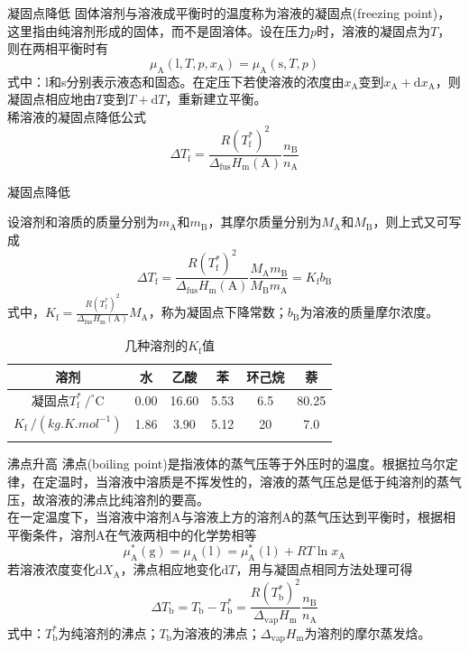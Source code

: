 \begin{frame}{凝固点降低}
    固体溶剂与溶液成平衡时的温度称为溶液的凝固点(freezing point)，这里指由纯溶剂形成的固体，而不是固溶体。设在压力$p$时，溶液的凝固点为$T$，则在两相平衡时有
    $$\mu_{\mathrm{A}}(\mathrm{l}, T, p, x_{\mathrm{A}})=\mu_{\mathrm{A}}(\mathrm{s}, T, p)$$
    式中：l和s分别表示液态和固态。在定压下若使溶液的浓度由$x_{\mathrm{A}}$变到$x_{\mathrm{A}}+\mathrm{d}x_{\mathrm{A}}$，则凝固点相应地由$T$变到$T+\mathrm{d}T$，重新建立平衡。
    \\稀溶液的凝固点降低公式
    $$\Delta T_{\mathrm{f}}=\frac{R\left(T_{\mathrm{f}}^{*}\right)^{2}}{\Delta_{\mathrm{fus}} H_{\mathrm{m}}(\mathrm{A})} \frac{n_{\mathrm{B}}}{n_{\mathrm{A}}}$$
\end{frame}


\begin{frame}{凝固点降低}
    
    设溶剂和溶质的质量分别为$m_\mathrm{A}$和$m_\mathrm{B}$，其摩尔质量分别为$M_\mathrm{A}$和$M_\mathrm{B}$，则上式又可写成
    $$\Delta T_{\mathrm{f}}=\frac{R\left(T_{\mathrm{f}}^{*}\right)^{2}}{\Delta_{\mathrm{fus}} H_{\mathrm{m}}(\mathrm{A})} \frac{M_\mathrm{A}m_\mathrm{B}}{M_\mathrm{B}m_\mathrm{A}}=K_{\mathrm{f}} b_{\mathrm{B}}$$
    式中，$K_{\mathrm{f}}=\frac{R\left(T_{\mathrm{f}}^{*}\right)^{2}}{\Delta_{\mathrm{fus}} H_{\mathrm{m}}(\mathrm{A})} M_{\mathrm{A}}$，称为凝固点下降常数；$b_\mathrm{B}$为溶液的质量摩尔浓度。
    \begin{table}
        \centering
        \caption{几种溶剂的$K_\mathrm{f}$值}
        \begin{tabular}{cccccc}
            \Xhline{1pt}
            \rowcolor{maincolor!10}
            溶剂 & 水 & 乙酸 & 苯 & 环己烷 & 萘 \\
            \hline
            凝固点$T_{\mathrm{f}}^{*}~/^{\circ}\mathrm{C}$ & 0.00 & 16.60 & 5.53 & 6.5 & 80.25 \\
            $K_\mathrm{f}~/(\si{kg.K.mol^{-1}})$ & 1.86 & 3.90 & 5.12 & 20 & 7.0 \\
            \Xhline{1pt}
        \end{tabular}
    \end{table}
\end{frame}


\begin{frame}{沸点升高}
    沸点(boiling point)是指液体的蒸气压等于外压时的温度。根据拉乌尔定律，在定温时，当溶液中溶质是不挥发性的，溶液的蒸气压总是低于纯溶剂的蒸气压，故溶液的沸点比纯溶剂的要高。
    \\在一定温度下，当溶液中溶剂A与溶液上方的溶剂A的蒸气压达到平衡时，根据相平衡条件，溶剂A在气液两相中的化学势相等
    $$\mu_{\mathrm{A}}^{*}(\mathrm{g})=\mu_{\mathrm{A}}(\mathrm{l})=\mu_{\mathrm{A}}^{*}(\mathrm{l})+R T \ln x_{\mathrm{A}}$$
    若溶液浓度变化$\mathrm{d}X_\mathrm{A}$，沸点相应地变化$\mathrm{d}T$，用与凝固点相同方法处理可得
    $$\Delta T_{\mathrm{b}}=T_{\mathrm{b}}-T_{\mathrm{b}}^{*}=\frac{R\left(T_{\mathrm{b}}^{*}\right)^{2}}{\Delta_{\mathrm{vap}} H_{\mathrm{m}}} \frac{n_{\mathrm{B}}}{n_{\mathrm{A}}}$$
    式中：$T_{\mathrm{b}}^{*}$为纯溶剂的沸点；$T_{\mathrm{b}}$为溶液的沸点；$\Delta_{\mathrm{vap}} H_{\mathrm{m}}$为溶剂的摩尔蒸发焓。
\end{frame}



